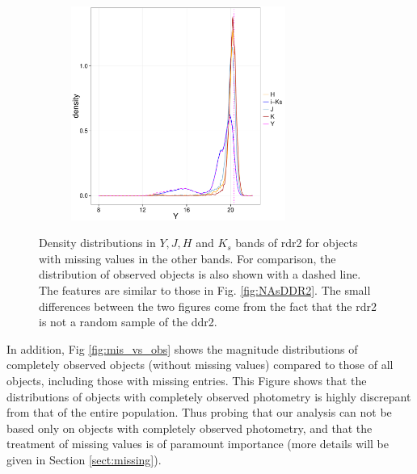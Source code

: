 \begin{figure}[ht!]
\begin{subfigure}[t]{0.45\textwidth}
    \end{subfigure}
     \begin{subfigure}[t]{0.45\textwidth}
      \includegraphics[page=4,height=7cm]{background/Figures/MissingDistributions.pdf}
    \end{subfigure}
\caption{Density distributions in $Y,J,H$ and $K_s$ bands of \gls{rdr2} for objects with missing values in the other bands. For comparison, the distribution of observed objects is also shown with a dashed line. The features are similar to those in Fig. \ref{fig:NAsDDR2}. The small differences between the two figures come from the fact that the \gls{rdr2} is not a random sample of the \gls{ddr2}.}
\label{fig:NAs}
\end{figure}

In addition, Fig \ref{fig:mis_vs_obs} shows the magnitude distributions of completely observed objects (without missing values) compared to those of all objects, including those with missing entries. This Figure shows that the distributions of objects with completely observed photometry is highly discrepant from that of the entire population. Thus probing that our analysis can not be based only on objects with completely observed photometry, and that the treatment of missing values is of paramount importance (more details will be given in Section \ref{sect:missing}).

